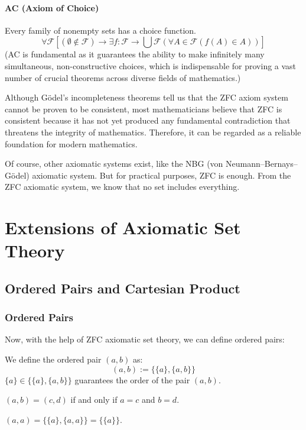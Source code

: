 \documentclass[oneside]{book}
\begin{document}
\paragraph{AC (Axiom of Choice)}
Every family of nonempty sets has a choice function.
$$ \forall \mathcal{F} [(\emptyset \notin \mathcal{F}) \to \exists f: \mathcal{F} \to \bigcup \mathcal{F} (\forall A \in \mathcal{F} (f(A) \in A))] $$
(AC is fundamental as it guarantees the ability to make infinitely many simultaneous, non-constructive choices, which is indispensable for proving a vast number of crucial theorems across diverse fields of mathematics.)

Although Gödel's incompleteness theorems tell us that the ZFC axiom system cannot be proven to be consistent, most mathematicians believe that ZFC is consistent because it has not yet produced any fundamental contradiction that threatens the integrity of mathematics. Therefore, it can be regarded as a reliable foundation for modern mathematics.

Of course, other axiomatic systems exist, like the NBG (von Neumann–Bernays–Gödel) axiomatic system. But for practical purposes, ZFC is enough. From the ZFC axiomatic system, we know that no set includes everything.

\section{Extensions of Axiomatic Set Theory}

\subsection{Ordered Pairs and Cartesian Product}

\subsubsection{Ordered Pairs}
Now, with the help of ZFC axiomatic set theory, we can define ordered pairs:
\begin{definition}
We define the ordered pair $(a,b)$ as:
$$ (a,b) := \{\{a\}, \{a,b\}\} $$
$\{a\} \in \{\{a\}, \{a,b\}\}$ guarantees the order of the pair $(a,b)$.
\end{definition}

\begin{inference}
$(a,b) = (c,d)$ if and only if $a=c$ and $b=d$.
\end{inference}
\begin{inference}
$(a,a) = \{\{a\}, \{a,a\}\} = \{\{a\}\}$.
\end{inference}
\end{document}
